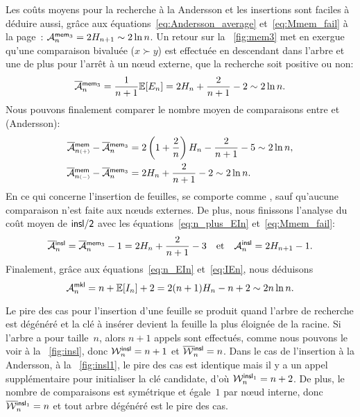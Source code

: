 Les coûts moyens pour la recherche à la Andersson et les insertions
sont faciles à déduire aussi, grâce aux
équations~\eqref{eq:Andersson_average} 
et~\eqref{eq:Mmem_fail} à la page~\pageref{eq:Mmem_fail}:
\(\M{\fun{mem}_3}{n} = 2H_{n+1} \sim 2 \ln
n\). Un retour sur la
\fig~\vref{fig:mem3} met en exergue qu'une comparaison bivaluée (\(x
\succ y\)) est effectuée en descendant dans l'arbre et une de plus
pour l'arrêt à un nœud externe, que la recherche soit positive ou
non:
\begin{equation*}
  \OM{\fun{mem}_3}{n} = \frac{1}{n+1}\Expected{E_n} =
  2H_n + \frac{2}{n+1} - 2 \sim 2\ln n.
\end{equation*}
Nous pouvons finalement comparer le nombre moyen de comparaisons entre
 et  (Andersson):
\begin{align*}
  \OM{\fun{mem}}{n{\scriptscriptstyle(+)}} - \OM{\fun{mem}_3}{n}
&= 2\left(1 + \frac{2}{n}\right)H_n - \frac{2}{n+1} - 5 \sim 2\ln n,\\
  \OM{\fun{mem}}{n{\scriptscriptstyle(-)}} - \OM{\fun{mem}_3}{n}
&= 2H_n + \frac{2}{n+1} - 2 \sim 2\ln n.
\end{align*}
En ce qui concerne l'insertion de feuilles,
 se comporte comme
, sauf qu'aucune
comparaison n'est faite aux nœuds externes. De plus, nous
finissons l'analyse du coût moyen de \(\fun{insl/2}\) avec les
équations~\eqref{eq:n_plus_EIn} et~\eqref{eq:Mmem_fail}:
\begin{equation*}
  \OM{\fun{insl}}{n} =
  \OM{\fun{mem}_3}{n} - 1 = 2H_n + \frac{2}{n+1} -
  3\quad\text{et}\quad \M{\fun{insl}}{n} = 2H_{n+1} - 1.
\index{insl@$\OM{\fun{insl}}{n}$}
\index{mem3@$\OM{\fun{mem}_3}{n}$}
\end{equation*}
Finalement, grâce aux équations~\eqref{eq:n_EIn} et~\eqref{eq:IEn},
nous déduisons
\begin{equation}
\M{\fun{mkl}}{n} = n + \Expected{I_n} + 2 = 2(n+1)H_n - n + 2
\sim 2n\ln n.
\index{mkl@$\M{\fun{mkl}}{n}$}
\label{eq:Mmkl}
\end{equation}


Le pire des cas pour l'insertion d'une feuille se produit quand
l'arbre de recherche est dégénéré
et la clé à insérer devient la feuille la plus éloignée de la racine.
Si l'arbre a pour taille~\(n\), alors \(n+1\) appels sont effectués,
comme nous pouvons le voir à la \fig~\vref{fig:insl}, donc
\(\W{\fun{insl}}{n} = n + 1\) et
\(\OW{\fun{insl}}{n} = n\). Dans le
cas de l'insertion à la Andersson, à la \fig~\vref{fig:insl1}, le pire
des cas est identique mais il y a un appel supplémentaire pour
initialiser la clé candidate, d'où \(\W{\fun{insl}_1}{n} = n +
2\). De plus, le nombre de
comparaisons est symétrique et égale~\(1\) par nœud interne, donc
\(\OW{\fun{insl}_1}{n} = n\) et
tout arbre dégénéré est le pire des cas.

